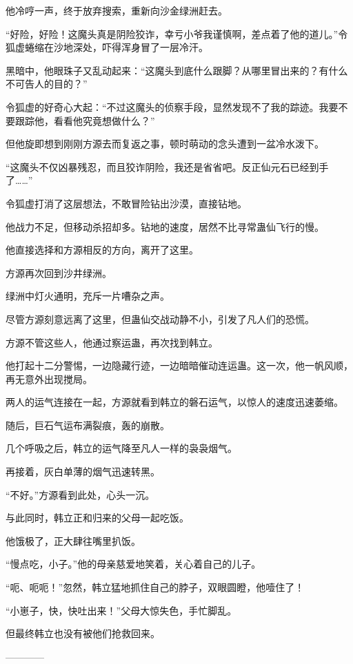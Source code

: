 \begin{this_body}
他冷哼一声，终于放弃搜索，重新向沙金绿洲赶去。

“好险，好险！这魔头真是阴险狡诈，幸亏小爷我谨慎啊，差点着了他的道儿。”令狐虚蜷缩在沙地深处，吓得浑身冒了一层冷汗。

黑暗中，他眼珠子又乱动起来：“这魔头到底什么跟脚？从哪里冒出来的？有什么不可告人的目的？”

令狐虚的好奇心大起：“不过这魔头的侦察手段，显然发现不了我的踪迹。我要不要跟踪他，看看他究竟想做什么？”

但他旋即想到刚刚方源去而复返之事，顿时萌动的念头遭到一盆冷水泼下。

“这魔头不仅凶暴残忍，而且狡诈阴险，我还是省省吧。反正仙元石已经到手了……”

令狐虚打消了这层想法，不敢冒险钻出沙漠，直接钻地。

他战力不足，但移动杀招却多。钻地的速度，居然不比寻常蛊仙飞行的慢。

他直接选择和方源相反的方向，离开了这里。

方源再次回到沙井绿洲。

绿洲中灯火通明，充斥一片嘈杂之声。

尽管方源刻意远离了这里，但蛊仙交战动静不小，引发了凡人们的恐慌。

方源不管这些人，他通过察运蛊，再次找到韩立。

他打起十二分警惕，一边隐藏行迹，一边暗暗催动连运蛊。这一次，他一帆风顺，再无意外出现搅局。

两人的运气连接在一起，方源就看到韩立的磐石运气，以惊人的速度迅速萎缩。

随后，巨石气运布满裂痕，轰的崩散。

几个呼吸之后，韩立的运气降至凡人一样的袅袅烟气。

再接着，灰白单薄的烟气迅速转黑。

“不好。”方源看到此处，心头一沉。

与此同时，韩立正和归来的父母一起吃饭。

他饿极了，正大肆往嘴里扒饭。

“慢点吃，小子。”他的母亲慈爱地笑着，关心着自己的儿子。

“呃、呃呃！”忽然，韩立猛地抓住自己的脖子，双眼圆瞪，他噎住了！

“小崽子，快，快吐出来！”父母大惊失色，手忙脚乱。

但最终韩立也没有被他们抢救回来。

------------

\end{this_body}

